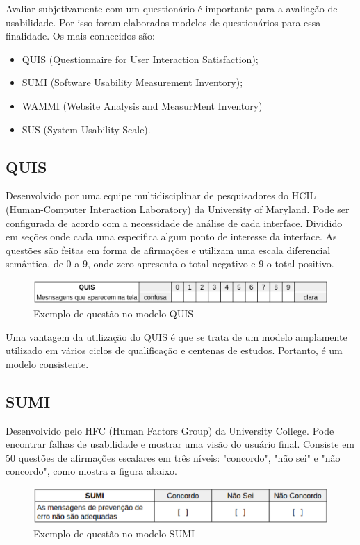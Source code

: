  Avaliar subjetivamente com um questionário é importante para a avaliação de usabilidade. Por isso foram elaborados modelos de questionários para essa finalidade. Os mais conhecidos são:

 \begin{itemize}
	\item QUIS (Questionnaire for User Interaction Satisfaction);
	\item SUMI (Software Usability Measurement Inventory);
	\item WAMMI (Website Analysis and MeasurMent Inventory)
	\item SUS (System Usability Scale).
\end{itemize}

\subsection{QUIS}
Desenvolvido por uma equipe multidisciplinar de pesquisadores do HCIL (Human-Computer Interaction Laboratory) da University of Maryland. Pode ser configurada de acordo com a necessidade de análise de cada interface. Dividido em seções onde cada uma especifica algum ponto de interesse da interface.
As questões são feitas em forma de afirmações e utilizam uma escala diferencial semântica, de 0 a 9, onde zero apresenta o total negativo e 9 o total positivo.

\begin{figure}[h]
	\centering
	\includegraphics[scale=0.5]{figuras/quis.eps}
	\caption{Exemplo de questão no modelo QUIS}
\end{figure}

Uma vantagem da utilização do QUIS é que se trata de um modelo amplamente utilizado em vários ciclos de qualificação e centenas de estudos. Portanto, é um modelo consistente.

\subsection{SUMI}
Desenvolvido pelo HFC (Human Factors Group) da University College. Pode encontrar falhas de usabilidade e mostrar uma visão do usuário final. Consiste em 50 questões de afirmações escalares em três níveis: "concordo", "não sei" e "não concordo", como mostra a figura abaixo.

\begin{figure}[h]
	\centering
	\includegraphics[scale=0.5]{figuras/sumi.eps}
	\caption{Exemplo de questão no modelo SUMI}
\end{figure}

